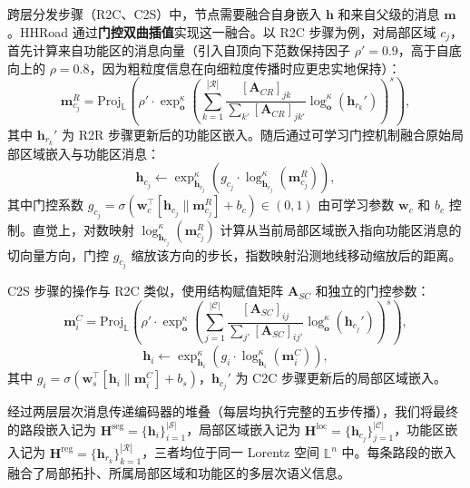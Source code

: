 跨层分发步骤（R2C、C2S）中，节点需要融合自身嵌入 $\mathbf{h}$ 和来自父级的消息 $\mathbf{m}$。HHRoad 通过\textbf{门控双曲插值}实现这一融合。以 R2C 步骤为例，对局部区域 $c_j$，首先计算来自功能区的消息向量（引入自顶向下范数保持因子 $\rho' = 0.9$，高于自底向上的 $\rho = 0.8$，因为粗粒度信息在向细粒度传播时应更忠实地保持）：
\begin{equation}
    \mathbf{m}_{c_j}^{R} = \text{Proj}_{\mathbb{L}}\!\left(
      \rho' \cdot \exp_{\mathbf{o}}^\kappa\!\left(
        \sum_{k=1}^{|\mathcal{R}|} \frac{[\mathbf{A}_{CR}]_{jk}}{\sum_{k'} [\mathbf{A}_{CR}]_{jk'}}
        \log_{\mathbf{o}}^\kappa(\mathbf{h}_{r_k}')
      \right)^s
    \right),
    \label{eq:f2c_msg}
\end{equation}
其中 $\mathbf{h}_{r_k}'$ 为 R2R 步骤更新后的功能区嵌入。随后通过可学习门控机制融合原始局部区域嵌入与功能区消息：
\begin{equation}
    \mathbf{h}_{c_j} \leftarrow \exp_{\mathbf{h}_{c_j}}^\kappa\!\left(
      g_{c_j} \cdot \log_{\mathbf{h}_{c_j}}^\kappa(\mathbf{m}_{c_j}^{R})
    \right),
    \label{eq:gate_loc}
\end{equation}
其中门控系数 $g_{c_j} = \sigma\!\left(\mathbf{w}_c^\top [\mathbf{h}_{c_j} \| \mathbf{m}_{c_j}^{R}] + b_c\right) \in (0,1)$ 由可学习参数 $\mathbf{w}_c$ 和 $b_c$ 控制。直觉上，对数映射 $\log_{\mathbf{h}_{c_j}}^\kappa(\mathbf{m}_{c_j}^{R})$ 计算从当前局部区域嵌入指向功能区消息的切向量方向，门控 $g_{c_j}$ 缩放该方向的步长，指数映射沿测地线移动缩放后的距离。

C2S 步骤的操作与 R2C 类似，使用结构赋值矩阵 $\mathbf{A}_{SC}$ 和独立的门控参数：
\begin{equation}
    \mathbf{m}_{i}^{C} = \text{Proj}_{\mathbb{L}}\!\left(
      \rho' \cdot \exp_{\mathbf{o}}^\kappa\!\left(
        \sum_{j=1}^{|\mathcal{C}|} \frac{[\mathbf{A}_{SC}]_{ij}}{\sum_{j'} [\mathbf{A}_{SC}]_{ij'}}
        \log_{\mathbf{o}}^\kappa(\mathbf{h}_{c_j}')
      \right)^s
    \right),
    \label{eq:c2s_msg}
\end{equation}
\begin{equation}
    \mathbf{h}_{i} \leftarrow \exp_{\mathbf{h}_{i}}^\kappa\!\left(
      g_{i} \cdot \log_{\mathbf{h}_{i}}^\kappa(\mathbf{m}_{i}^{C})
    \right),
    \label{eq:gate_seg}
\end{equation}
其中 $g_{i} = \sigma\!\left(\mathbf{w}_s^\top [\mathbf{h}_{i} \| \mathbf{m}_{i}^{C}] + b_s\right)$，$\mathbf{h}_{c_j}'$ 为 C2C 步骤更新后的局部区域嵌入。

经过两层层次消息传递编码器的堆叠（每层均执行完整的五步传播），我们将最终的路段嵌入记为 $\mathbf{H}^{\text{seg}} = \{\mathbf{h}_i\}_{i=1}^{|\mathcal{S}|}$，局部区域嵌入记为 $\mathbf{H}^{\text{loc}} = \{\mathbf{h}_{c_j}\}_{j=1}^{|\mathcal{C}|}$，功能区嵌入记为 $\mathbf{H}^{\text{reg}} = \{\mathbf{h}_{r_k}\}_{k=1}^{|\mathcal{R}|}$，三者均位于同一 Lorentz 空间 $\mathbb{L}^n$ 中。每条路段的嵌入融合了局部拓扑、所属局部区域和功能区的多层次语义信息。

